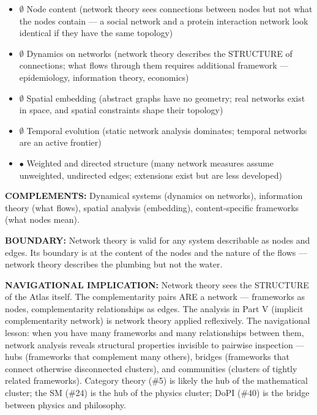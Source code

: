 \begin{itemize}[nosep,leftmargin=*]
  \item $\emptyset$ Node content (network theory sees connections between nodes but not what the nodes contain — a social network and a protein interaction network look identical if they have the same topology)
  \item $\emptyset$ Dynamics on networks (network theory describes the STRUCTURE of connections; what flows through them requires additional framework — epidemiology, information theory, economics)
  \item $\emptyset$ Spatial embedding (abstract graphs have no geometry; real networks exist in space, and spatial constraints shape their topology)
  \item $\emptyset$ Temporal evolution (static network analysis dominates; temporal networks are an active frontier)
  \item $\bullet$ Weighted and directed structure (many network measures assume unweighted, undirected edges; extensions exist but are less developed)
\end{itemize}


\textbf{COMPLEMENTS:} Dynamical systems (dynamics on networks), information theory (what flows), spatial analysis (embedding), content-specific frameworks (what nodes mean).


\textbf{BOUNDARY:} Network theory is valid for any system describable as nodes and edges. Its boundary is at the content of the nodes and the nature of the flows — network theory describes the plumbing but not the water.


\textbf{NAVIGATIONAL IMPLICATION:} Network theory sees the STRUCTURE of the Atlas itself. The complementarity pairs ARE a network — frameworks as nodes, complementarity relationships as edges. The analysis in Part V (implicit complementarity network) is network theory applied reflexively. The navigational lesson: when you have many frameworks and many relationships between them, network analysis reveals structural properties invisible to pairwise inspection — hubs (frameworks that complement many others), bridges (frameworks that connect otherwise disconnected clusters), and communities (clusters of tightly related frameworks). Category theory (\#5) is likely the hub of the mathematical cluster; the SM (\#24) is the hub of the physics cluster; DoPI (\#40) is the bridge between physics and philosophy.


\bigskip\noindent\makebox[\textwidth]{\color{rulegray}\rule{5cm}{0.3pt}}\bigskip



